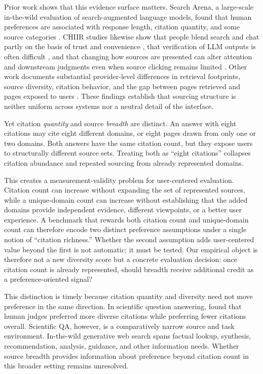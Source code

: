\documentclass[sigconf,natbib=true,anonymous=true]{acmart}
\begin{document}
Prior work shows that this evidence surface matters. Search Arena, a large-scale in-the-wild evaluation of search-augmented language models, found that human preferences are associated with response length, citation quantity, and some source categories \citep{miroyan2026searcharena}. CHIIR studies likewise show that people blend search and chat partly on the basis of trust and convenience \citep{mayerhofer2025blending}, that verification of LLM outputs is often difficult \citep{scozzi2026infallible}, and that changing how sources are presented can alter attention and downstream judgments even when source clicking remains limited \citep{he2026transparency}. Other work documents substantial provider-level differences in retrieval footprints, source diversity, citation behavior, and the gap between pages retrieved and pages exposed to users \citep{kirsten2026characterizing,strauss2026attribution,huang2026answerbubbles}. These findings establish that sourcing structure is neither uniform across systems nor a neutral detail of the interface.

Yet citation \emph{quantity} and source \emph{breadth} are distinct. An answer with eight citations may cite eight different domains, or eight pages drawn from only one or two domains. Both answers have the same citation count, but they expose users to structurally different source sets. Treating both as ``eight citations'' collapses citation abundance and repeated sourcing from already represented domains.

This creates a measurement-validity problem for user-centered evaluation. Citation count can increase without expanding the set of represented sources, while a unique-domain count can increase without establishing that the added domains provide independent evidence, different viewpoints, or a better user experience. A benchmark that rewards both citation count and unique-domain count can therefore encode two distinct preference assumptions under a single notion of ``citation richness.'' Whether the second assumption adds user-centered value beyond the first is not automatic; it must be tested. Our empirical object is therefore not a new diversity score but a concrete evaluation decision: once citation count is already represented, should breadth receive additional credit as a preference-oriented signal?

This distinction is timely because citation quantity and diversity need not move preference in the same direction. In scientific question answering, \citet{hou2026citations} found that human judges preferred more diverse citations while preferring fewer citations overall. Scientific QA, however, is a comparatively narrow source and task environment. In-the-wild generative web search spans factual lookup, synthesis, recommendation, analysis, guidance, and other information needs. Whether source breadth provides information about preference beyond citation count in this broader setting remains unresolved.
\end{document}
